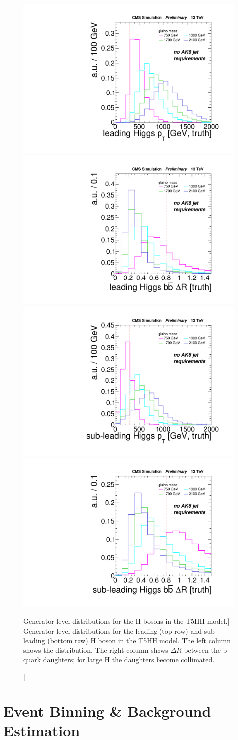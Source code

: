\begin{figure}
\centering
\includegraphics[width=0.425\linewidth]{figs/leadHiggsPt.pdf}
\includegraphics[width=0.425\linewidth]{figs/leadHiggsDr.pdf}\\
\includegraphics[width=0.425\linewidth]{figs/subleadHiggsPt.pdf}
\includegraphics[width=0.425\linewidth]{figs/subleadHiggsDr.pdf}\\
\caption
[Generator level distributions for the H bosons in the T5HH model.]
{Generator level distributions for the leading (top row) and sub-leading (bottom row) H boson in the T5HH model. The left column shows the \pt distribution. The right column shows $\Delta R$ between the b-quark daughters; for large H \pt the daughters become collimated. \cite{boostedan}}
\label{fig:GenHiggsBoost}
\end{figure}

\section{Event Binning \& Background Estimation}

